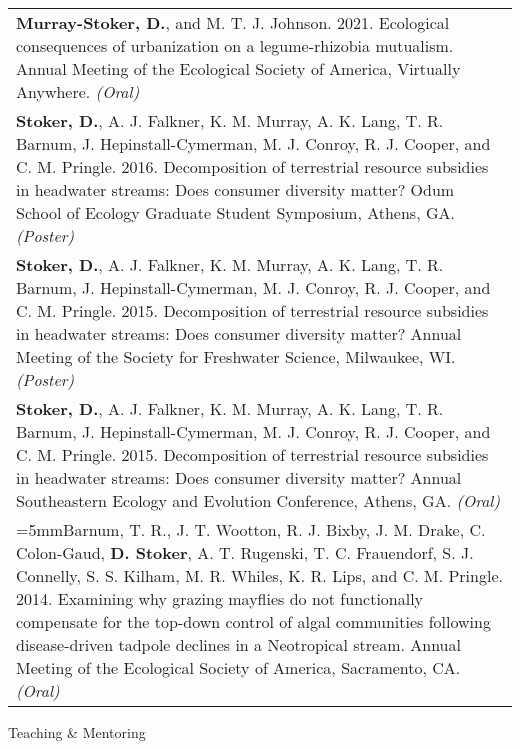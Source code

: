 \documentclass[letterpaper,11pt,oneside]{article}
\begin{document}
\def\arraystretch{1.4}
\noindent \begin{longtable}{@{} >{\raggedright\arraybackslash}p{17.2cm}}
\hangindent=5mm\textbf{Murray-Stoker, D.}, and M. T. J. Johnson. 2021. Ecological consequences of urbanization on a legume-rhizobia mutualism. Annual Meeting of the Ecological Society of America, Virtually Anywhere. \textit{(Oral)} \\
\hangindent=5mm\textbf{Stoker, D.}, A. J. Falkner, K. M. Murray, A. K. Lang, T. R. Barnum, J. Hepinstall-Cymerman, M. J. Conroy, R. J. Cooper, and C. M. Pringle. 2016. Decomposition of terrestrial resource subsidies in headwater streams: Does consumer diversity matter? Odum School of Ecology Graduate Student Symposium, Athens, GA. \textit{(Poster)} \\
\hangindent=5mm\textbf{Stoker, D.}, A. J. Falkner, K. M. Murray, A. K. Lang, T. R. Barnum, J. Hepinstall-Cymerman, M. J. Conroy, R. J. Cooper, and C. M. Pringle. 2015. Decomposition of terrestrial resource subsidies in headwater streams: Does consumer diversity matter? Annual Meeting of the Society for Freshwater Science, Milwaukee, WI. \textit{(Poster)} \\
\hangindent=5mm\textbf{Stoker, D.}, A. J. Falkner, K. M. Murray, A. K. Lang, T. R. Barnum, J. Hepinstall-Cymerman, M. J. Conroy, R. J. Cooper, and C. M. Pringle. 2015. Decomposition of terrestrial resource subsidies in headwater streams: Does consumer diversity matter? Annual Southeastern Ecology and Evolution Conference, Athens, GA. \textit{(Oral)} \\
\hangindent=5mmBarnum, T. R., J. T. Wootton, R. J. Bixby, J. M. Drake, C. Colon-Gaud, \textbf{D. Stoker}, A. T. Rugenski, T. C. Frauendorf, S. J. Connelly, S. S. Kilham, M. R. Whiles, K. R. Lips, and C. M. Pringle. 2014. Examining why grazing mayflies do not functionally compensate for the top-down control of algal communities following disease-driven tadpole declines in a Neotropical stream. Annual Meeting of the Ecological Society of America, Sacramento, CA. \textit{(Oral)}
\end{longtable}

\bigskip





\noindent\Large{Teaching \& Mentoring}
\normalsize
\bigskip
\end{document}
